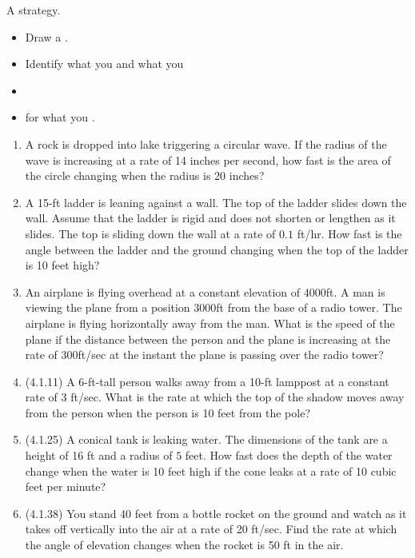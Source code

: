 \documentclass[11pt,fleqn]{article}
\begin{document}
\setlength{\parindent}{0cm}
\renewcommand{\headrulewidth}{0pt}
\newcommand{\blank}[1]{\rule{#1}{0.75pt}}
\renewcommand{\d}{\displaystyle}
\vspace*{-0.7in}
\begin{center}
 {\large{ }}
\end{center}
 	
A strategy.
\begin{itemize}
\item Draw a .
\item Identify what you  and what you  
\item {} 
\item {} for what you .
\end{itemize}

\hrulefill

\begin{enumerate}
\item A rock is dropped into lake triggering a circular wave. If the radius of the wave is increasing at a rate of 14 inches per second, how fast is the area of the circle changing when the radius is 20 inches?
\vfill
\item A 15-ft ladder is leaning against a wall. The top of the ladder slides down the wall. Assume that the ladder is rigid and does not shorten or lengthen as it slides. The top is sliding down the wall at a rate of $0.1$ ft/hr. How fast is the angle between the ladder and the ground changing when the top of the ladder is 10 feet high?
\vfill
\newpage
\item An airplane is flying overhead at a constant elevation of 4000ft. A man is viewing the plane from a position 3000ft from the base of a radio tower. The airplane is flying horizontally away from the man. What is the speed of the plane if the distance between the person and the plane is increasing at the rate of 300ft/sec at the instant the plane is passing over the radio tower?
\vfill

\item  (4.1.11) A 6-ft-tall person walks away from a 10-ft lamppost at a constant rate of 3 ft/sec. What is the rate at which the top of the shadow moves away from the person when the person is 10 feet from the pole?
\item (4.1.25) A conical tank is leaking water. The dimensions of the tank are a height of 16 ft and a radius of $5$ feet. How fast does the depth of the water change when the water is 10 feet high if the cone leaks at a rate of 10 cubic feet per minute?
\item (4.1.38) You stand 40 feet from a bottle rocket on the ground and watch as it takes off vertically into the air at a rate of 20 ft/sec. Find the rate at which the angle of elevation changes when the rocket is 50 ft in the air.
\end{enumerate}
\end{document}
